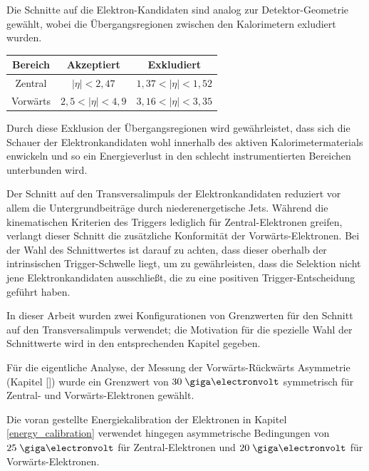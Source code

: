 \begin{description}
        Die Schnitte auf die Elektron-Kandidaten sind analog zur
        Detektor-Geometrie gewählt, wobei die Übergangsregionen zwischen den
        Kalorimetern exludiert wurden.
        \begin{table}[h!]
            \centering
            \begin{tabular}{|c|c|c|}
                \hline
                \bf{Bereich} & \bf{Akzeptiert} & \bf{Exkludiert} \\
                \hline \hline
                Zentral  & $|\eta| < 2,47$      & $1,37 < |\eta| < 1,52$ \\
                Vorwärts & $2,5 < |\eta| < 4,9$ & $3,16 < |\eta| < 3,35$ \\
                \hline
            \end{tabular}
        \end{table}

        Durch diese Exklusion der Übergangsregionen wird gewährleistet, dass
        sich die Schauer der Elektronkandidaten wohl innerhalb des aktiven
        Kalorimetermaterials enwickeln und so ein Energieverlust in den
        schlecht instrumentierten Bereichen unterbunden wird.


        Der Schnitt auf den Transversalimpuls der Elektronkandidaten reduziert
        vor allem die Untergrundbeiträge durch niederenergetische Jets. Während
        die kinematischen Kriterien des Triggers lediglich für
        Zentral-Elektronen greifen, verlangt dieser Schnitt die zusätzliche
        Konformität der Vorwärts-Elektronen. Bei der Wahl des Schnittwertes ist
        darauf zu achten, dass dieser oberhalb der intrinsischen
        Trigger-Schwelle liegt, um zu gewährleisten, dass die Selektion nicht
        jene Elektronkandidaten ausschließt, die zu eine positiven
        Trigger-Entscheidung geführt haben.

        In dieser Arbeit wurden zwei Konfigurationen von Grenzwerten für den
        Schnitt auf den Transversalimpuls verwendet; die Motivation für die
        spezielle Wahl der Schnittwerte wird in den entsprechenden Kapitel
        gegeben.

        Für die eigentliche Analyse, der Messung der Vorwärts-Rückwärts
        Asymmetrie (Kapitel \ref{})
        wurde ein Grenzwert von \emph{$30\GeV$} symmetrisch für Zentral- und
        Vorwärts-Elektronen gewählt.

        Die voran gestellte Energiekalibration der Elektronen in Kapitel
        \ref{energy_calibration} verwendet hingegen asymmetrische Bedingungen
        von \emph{$25\GeV$} für Zentral-Elektronen und \emph{$20\GeV$} für
        Vorwärts-Elektronen.


\end{description}
